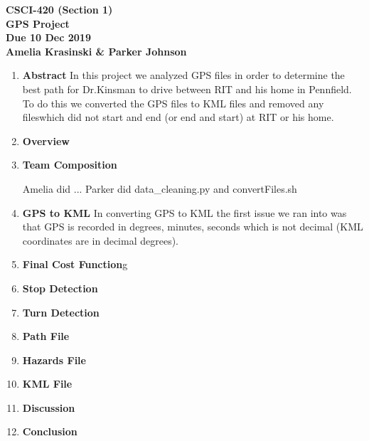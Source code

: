 \documentclass[12pt]{article}
\begin{document}
\begin{center} {\bf
	CSCI-420 (Section 1) \\
	GPS Project \\
	Due 10 Dec 2019 \\
	Amelia Krasinski \& Parker Johnson }
\end{center}

\begin{enumerate}
	\item \textbf{Abstract}
	In this project we analyzed GPS files in order to determine the best path 
	for Dr.Kinsman to drive between RIT and his home in Pennfield. To do this 
	we converted the GPS files to KML files and removed any fileswhich did not 
	start and end (or end and start) at RIT or his home.
	\item \textbf{Overview}
	
	\item \textbf{Team Composition}
	
		Amelia did ...
		Parker did data_cleaning.py and convertFiles.sh
		
	
	\item \textbf{GPS to KML}
	In converting GPS to KML the first issue we ran into was that GPS is 
	recorded in degrees, minutes, seconds which is not decimal (KML 
	coordinates are in decimal degrees).
	
	\item \textbf{Final Cost Function}g
	
	\item \textbf{Stop Detection}
	
	\item \textbf{Turn Detection}
	
	\item \textbf{Path File}
	
	\item \textbf{Hazards File}
	
	\item \textbf{KML File}
	
	\item \textbf{Discussion}
	
	\item \textbf{Conclusion}
		
\end{enumerate}
\end{document}
